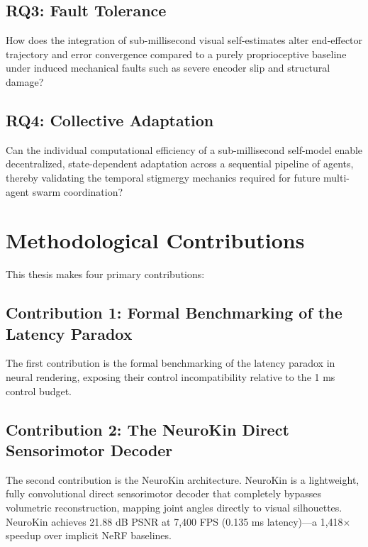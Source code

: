 \documentclass[12pt,a4paper,oneside]{report}
\begin{document}
\subsection{RQ3: Fault Tolerance}
\label{subsec:RQ3_intro}

How does the integration of sub-millisecond visual self-estimates alter end-effector trajectory and error convergence compared to a purely proprioceptive baseline under induced mechanical faults such as severe encoder slip and structural damage?

\subsection{RQ4: Collective Adaptation}
\label{subsec:RQ4_intro}

Can the individual computational efficiency of a sub-millisecond self-model enable decentralized, state-dependent adaptation across a sequential pipeline of agents, thereby validating the temporal stigmergy mechanics required for future multi-agent swarm coordination?

\section{Methodological Contributions}
\label{sec:methodological_contributions_intro}

This thesis makes four primary contributions:

\subsection{Contribution 1: Formal Benchmarking of the Latency Paradox}

The first contribution is the formal benchmarking of the latency paradox in neural rendering, exposing their control incompatibility relative to the 1 ms control budget.

\subsection{Contribution 2: The NeuroKin Direct Sensorimotor Decoder}

The second contribution is the NeuroKin architecture. NeuroKin is a lightweight, fully convolutional direct sensorimotor decoder that completely bypasses volumetric reconstruction, mapping joint angles directly to visual silhouettes. NeuroKin achieves 21.88 dB PSNR at 7,400 FPS (0.135 ms latency)---a 1,418$\times$ speedup over implicit NeRF baselines.
\end{document}
